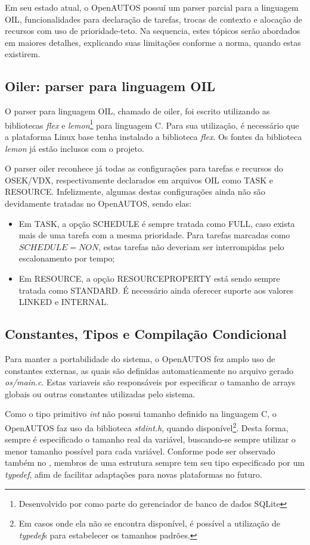 Em seu estado atual, o OpenAUTOS possuí um parser parcial para a linguagem OIL, funcionalidades para declaração de tarefas, trocas de contexto e alocação de recursos com uso de prioridade-teto. Na sequencia, estes tópicos serão abordados em maiores detalhes, explicando suas limitações conforme a norma, quando estas existirem.

\subsection{Oiler: parser para linguagem OIL} \label{cap:cap4_oiler}

O parser para linguagem OIL, chamado de oiler, foi escrito utilizando as bibliotecas \emph{flex} e \emph{lemon}\footnote{Desenvolvido por  como parte do gerenciador de banco de dados SQLite} para linguagem C. Para sua utilização, é necessário que a plataforma Linux base tenha instalado a biblioteca \emph{flex}. Os fontes da biblioteca \emph{lemon} já estão inclusos com o projeto.

O parser oiler reconhece já todas as configurações para tarefas e recursos do OSEK/VDX, respectivamente declarados em arquivos OIL como TASK e RESOURCE. Infelizmente, algumas destas configurações ainda não são devidamente tratadas no OpenAUTOS, sendo elas:

\begin{itemize}
	\item Em TASK, a opção SCHEDULE é sempre tratada como FULL, caso exista mais de uma tarefa com a mesma prioridade. Para tarefas marcadas como $SCHEDULE = NON$, estas tarefas não deveriam ser interrompidas pelo escalonamento por tempo;
	\item Em RESOURCE, a opção RESOURCEPROPERTY está sendo sempre tratada como STANDARD. É necessário ainda oferecer suporte aos valores LINKED e INTERNAL.
\end{itemize}

\subsection{Constantes, Tipos e Compilação Condicional}

Para manter a portabilidade do sistema, o OpenAUTOS fez amplo uso de constantes externas, as quais são definidas automaticamente no arquivo gerado \emph{os/main.c}. Estas variaveis são responsáveis por especificar o tamanho de arrays globais ou outras constantes utilizadas pelo sistema.

Como o tipo primitivo \emph{int} não possui tamanho definido na linguagem C, o OpenAUTOS faz uso da biblioteca \emph{stdint.h}, quando disponível\footnote{Em casos onde ela não se encontra disponível, é possível a utilização de \emph{typedef}s para estabelecer os tamanhos padrões.}. Desta forma, sempre é especificado o tamanho real da variável, buscando-se sempre utilizar o menor tamanho possível para cada variável. Conforme pode ser observado também no , membros de uma estrutura sempre tem seu tipo especificado por um \emph{typedef}, afim de facilitar adaptações para novas plataformas no futuro.

